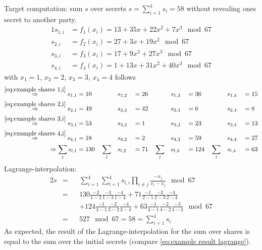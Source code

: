 \noindent Target computation: sum $s$ over secrets $s= \sum_{i=1}^4 s_i=58$ without revealing ones secret to another party.		
\begin{alignat}{1}
s_{1,i}&=f_1(x_i)=13 + 35x + 22x^2 + 7x^3 \mod 67 \label{eq:example shares 1,i} \\
s_{2,i}&=f_2(x_i)=27 + 3x + 19x^2 \mod 67 \label{eq:example shares 2,i} \\
s_{3,i}&=f_3(x_i)=17 + 9x^2 + 27x^3 \mod 67 \label{eq:example shares 3,i} \\
s_{4,i}&=f_4(x_i)=1 + 13x + 31x^2 + 40x^3 \mod 67 \label{eq:example shares 4,i}
\end{alignat}
with $x_1=1$, $x_2=2$, $x_3=3$, $x_4=4$ follows
\begin{alignat}{7}
\overset{\ref{eq:example shares 1,i}}{\Rightarrow} s_{1,1}&=10 \quad &&s_{1,2}&&=26 \quad &&s_{1,3}&&=36 \quad  &&s_{1,4}&&=15  \nonumber \\
\overset{\ref{eq:example shares 2,i}}{\Rightarrow} s_{2,1}&=49 \quad &&s_{2,2}&&=42 \quad &&s_{2,3}&&=6 \quad &&s_{2,4}&&=8  \nonumber \\
\overset{\ref{eq:example shares 3,i}}{\Rightarrow} s_{3,1}&=53 \quad &&s_{3,2}&&=1 \quad &&s_{3,3}&&=23 \quad &&s_{3,4}&&=13  \nonumber \\
\overset{\ref{eq:example shares 4,i}}{\Rightarrow} s_{4,1}&=18 \quad &&s_{4,2}&&=2 \quad &&s_{4,3}&&=59 \quad &&s_{4,4}&&=27 \nonumber \\
\Rightarrow \sum_l s_{l,1}&=130 \quad \sum_l && s_{l,2}&&=71 \quad \sum_l && s_{l,3}&&=124 \quad \sum_l && s_{l,4}&&=63 \nonumber		
\end{alignat}
Lagrange-interpolation:
\begin{alignat}{2}
s&= &&\sum_{i=1}^{4}\sum_{l=1}^{4}s_{l,i}\prod_{i \neq j} \frac{-x_j}{x_i-x_j}\mod 67 \nonumber \\
&= &&130\frac{-2}{1-2}\frac{-3}{1-3}\frac{-4}{1-4}+71\frac{-1}{2-1}\frac{-3}{2-3}\frac{-4}{2-4} \nonumber \\
& &&+124\frac{-1}{3-1}\frac{-2}{3-2}\frac{-4}{3-4}+63\frac{-1}{4-1}\frac{-2}{4-2}\frac{-3}{4-3}\mod 67 \nonumber \\
&=&& 527 \mod 67 = 58 = \sum_{i=1}^4 s_i \label{eq:example result lagrange}
\end{alignat}
As expected, the result of the Lagrange-interpolation for the sum over shares is equal to the sum over the initial secrets (compare \ref{eq:example result lagrange}).

